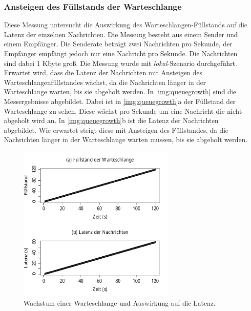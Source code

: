 \subsubsection{Ansteigen des Füllstands der Warteschlange}
\label{sec:queueGrowth}
Diese Messung untersucht die Auswirkung des Warteschlangen-Füllstands auf die Latenz der einzelnen Nachrichten. Die Messung besteht aus einem Sender und einem Empfänger. Die Senderate beträgt zwei Nachrichten pro Sekunde, der Empfänger empfängt jedoch nur eine Nachricht pro Sekunde. Die Nachrichten sind dabei 1 Kbyte groß. Die Messung wurde mit \textit{lokal}-Szenario durchgeführt. Erwartet wird, dass die Latenz der Nachrichten mit Ansteigen des Warteschlangenfüllstandes wächst, da die Nachrichten länger in der Warteschlange warten, bis sie abgeholt werden.
In \autoref{img:queuegrowth} sind die Messergebnisse abgebildet. Dabei ist in \autoref{img:queuegrowth}a der Füllstand der Warteschlange zu sehen. Diese wächst pro Sekunde um eine Nachricht die nicht abgeholt wird an. In \autoref{img:queuegrowth}b ist die Latenz der Nachrichten abgebildet. Wie erwartet steigt diese mit Ansteigen des Füllstandes, da die Nachrichten länger in der Warteschlange warten müssen, bis sie abgeholt werden.
\begin{figure}
\center
  \includegraphics[width=0.7\textwidth]{images/measurement/queuegrowth.pdf}
  \caption{Wachstum einer Warteschlange und Auswirkung auf die Latenz.}
  \label{img:queuegrowth}
\end{figure}

